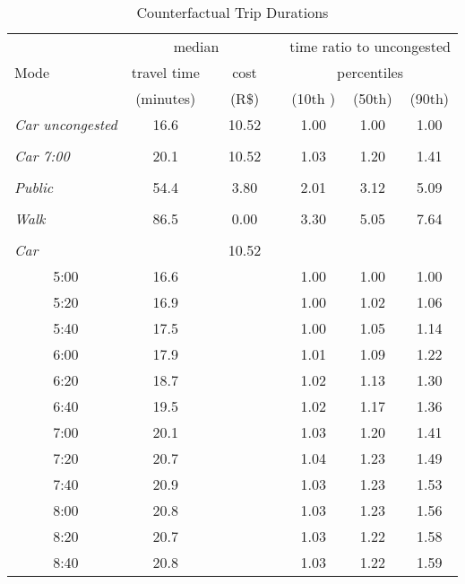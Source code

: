 \begin{table}[!htbp]
  \centering
  	\caption{Counterfactual Trip Durations}
  	\label{table:7am}
    \begin{tabular}{ccrcrccc}
    \toprule
    \toprule
      & \multicolumn{3}{c}{median} &   & \multicolumn{3}{c}{time ratio to uncongested} \\
\cmidrule{2-4}\cmidrule{6-8}    \multicolumn{1}{l}{Mode} & travel time &   & cost &   & \multicolumn{3}{c}{percentiles} \\
      & (minutes) &   & (R\$) &   & (10th ) & (50th) & (90th) \\
    \midrule
    \multicolumn{1}{l}{\textit{Car uncongested}} & 16.6 &   & 10.52 &   & 1.00 & 1.00 & 1.00 \\
      &   &   &   &   &   &   &  \\
    \multicolumn{1}{l}{\textit{Car 7:00}} & 20.1 &   & 10.52 &   & 1.03 & 1.20 & 1.41 \\
      &   &   &   &   &   &   &  \\
    \multicolumn{1}{l}{\textit{Public}} & 54.4 &   & 3.80 &   & 2.01 & 3.12 & 5.09 \\
      &   &   &   &   &   &   &  \\
    \multicolumn{1}{l}{\textit{Walk}} & 86.5 &   & 0.00 &   & 3.30 & 5.05 & 7.64 \\
      &   &   &   &   &   &   &  \\
    \multicolumn{1}{l}{\textit{Car}} &   &   & 10.52 &   &   &   &  \\
    5:00 & 16.6 &   &   &   & 1.00 & 1.00 & 1.00 \\
    5:20 & 16.9 &   &   &   & 1.00 & 1.02 & 1.06 \\
    5:40 & 17.5 &   &   &   & 1.00 & 1.05 & 1.14 \\
    6:00 & 17.9 &   &   &   & 1.01 & 1.09 & 1.22 \\
    6:20 & 18.7 &   &   &   & 1.02 & 1.13 & 1.30 \\
    6:40 & 19.5 &   &   &   & 1.02 & 1.17 & 1.36 \\
    7:00 & 20.1 &   &   &   & 1.03 & 1.20 & 1.41 \\
    7:20 & 20.7 &   &   &   & 1.04 & 1.23 & 1.49 \\
    7:40 & 20.9 &   &   &   & 1.03 & 1.23 & 1.53 \\
    8:00 & 20.8 &   &   &   & 1.03 & 1.23 & 1.56 \\
    8:20 & 20.7 &   &   &   & 1.03 & 1.22 & 1.58 \\
    8:40 & 20.8 &   &   &   & 1.03 & 1.22 & 1.59 \\
    \bottomrule
    \bottomrule
    \end{tabular}%
  \label{tab:addlabel}%
\end{table}%
